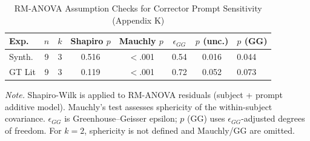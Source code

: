 \begin{table}[H]
\centering
\caption{RM-ANOVA Assumption Checks for Corrector Prompt Sensitivity (Appendix K)}
\label{tab:corrector_sensitivity_assumptions}
\begin{threeparttable}
\scriptsize
\setlength{\tabcolsep}{3pt}
\renewcommand{\arraystretch}{1.1}
\begin{tabular}{lccccccl}
\toprule
\textbf{Exp.} & \textbf{$n$} & \textbf{$k$} & \textbf{Shapiro $p$} & \textbf{Mauchly $p$} & \textbf{$\epsilon_{GG}$} & \textbf{$p$ (unc.)} & \textbf{$p$ (GG)} \\
\midrule
Synth. & 9 & 3 & 0.516 & $<$.001 & 0.54 & 0.016 & 0.044 \\
GT Lit & 9 & 3 & 0.119 & $<$.001 & 0.72 & 0.052 & 0.073 \\
\bottomrule
\end{tabular}
\begin{tablenotes}
\scriptsize
\item \textit{Note.} Shapiro-Wilk is applied to RM-ANOVA residuals (subject + prompt additive model). Mauchly's test assesses sphericity of the within-subject covariance. $\epsilon_{GG}$ is Greenhouse--Geisser epsilon; $p$ (GG) uses $\epsilon_{GG}$-adjusted degrees of freedom. For $k=2$, sphericity is not defined and Mauchly/GG are omitted.
\end{tablenotes}
\end{threeparttable}
\end{table}